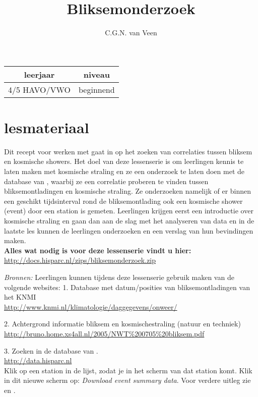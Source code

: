 
\usepackage{xfrac}
\usepackage{array}

\title{Bliksemonderzoek}
\author{C.G.N. van Veen}



\maketitle

\begin{tabular}{|c|c|}
\hline 
leerjaar & niveau \tabularnewline
\hline 
4/5 HAVO/VWO  & beginnend \tabularnewline
\hline 
\end{tabular}

\section{lesmateriaal}

Dit recept voor werken met \hisparc gaat in op het zoeken van correlaties tussen 
bliksem en kosmische showers. Het doel van deze lessenserie is om leerlingen 
kennis te laten maken met kosmische straling en ze een onderzoek te laten doen 
met de database van \hisparc, waarbij ze een correlatie proberen te vinden tussen 
bliksemontladingen en kosmische straling. Ze onderzoeken namelijk of er binnen een geschikt
tijdsinterval rond de bliksemontlading ook een kosmische shower (event) door 
een \hisparc station is gemeten.
Leerlingen krijgen eerst een introductie over kosmische straling en gaan
dan aan de slag met het analyseren van \hisparc data en in de laatste les kunnen 
de leerlingen onderzoeken en een verslag van hun bevindingen maken.
\\

\textbf{Alles wat nodig is voor deze lessenserie vindt u hier:}\\
\url{http://docs.hisparc.nl/zips/bliksemonderzoek.zip}


\textit{Bronnen:} Leerlingen kunnen tijdens deze lessenserie gebruik maken van de 
volgende websites:
1. Database met datum/posities van bliksemontladingen van het KNMI\\
\url{ http://www.knmi.nl/klimatologie/daggegevens/onweer/}

2. Achtergrond informatie bliksem en kosmischestraling (natuur en techniek)\\
\url{ http://bruno.home.xs4all.nl/2005/NWT%200705%20bliksem.pdf}

3. Zoeken in de database van \hisparc.\\
\url{http://data.hisparc.nl}\\
Klik op een station in de lijst, zodat je in het scherm van dat station komt.
Klik in dit nieuwe scherm op: \textit{Download event summary data}.
Voor verdere uitleg zie  en .

